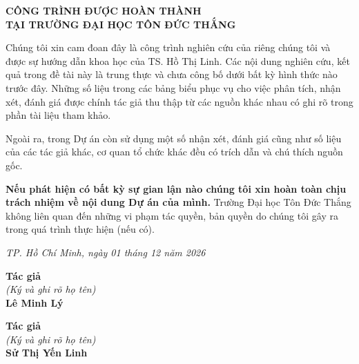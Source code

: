 \newpage
\begin{center}
{\fontsize{16pt}{24pt}\selectfont \textbf{CÔNG TRÌNH ĐƯỢC HOÀN THÀNH\\TẠI TRƯỜNG ĐẠI HỌC TÔN ĐỨC THẮNG}\par}
\end{center}
\vspace{0.5cm}

Chúng tôi xin cam đoan đây là công trình nghiên cứu của riêng chúng tôi và được sự hướng dẫn khoa học của TS. Hồ Thị Linh. Các nội dung nghiên cứu, kết quả trong đề tài này là trung thực và chưa công bố dưới bất kỳ hình thức nào trước đây. Những số liệu trong các bảng biểu phục vụ cho việc phân tích, nhận xét, đánh giá được chính tác giả thu thập từ các nguồn khác nhau có ghi rõ trong phần tài liệu tham khảo.

Ngoài ra, trong Dự án còn sử dụng một số nhận xét, đánh giá cũng như số liệu của các tác giả khác, cơ quan tổ chức khác đều có trích dẫn và chú thích nguồn gốc.

\textbf{Nếu phát hiện có bất kỳ sự gian lận nào chúng tôi xin hoàn toàn chịu trách nhiệm về nội dung Dự án của mình.} Trường Đại học Tôn Đức Thắng không liên quan đến những vi phạm tác quyền, bản quyền do chúng tôi gây ra trong quá trình thực hiện (nếu có).

\vspace{0.5cm}

\begin{flushright}
\textit{TP. Hồ Chí Minh, ngày 01 tháng 12 năm 2026}
\end{flushright}

\vspace{0.3cm}
\noindent
\begin{minipage}[t]{0.48\textwidth}
    \centering
    \textbf{Tác giả} \\
    \textit{(Ký và ghi rõ họ tên)} \\
    \vspace{2.5cm}
    \textbf{Lê Minh Lý}
\end{minipage}
\hfill
\begin{minipage}[t]{0.48\textwidth}
    \centering
    \textbf{Tác giả} \\
    \textit{(Ký và ghi rõ họ tên)} \\
    \vspace{2.5cm}
    \textbf{Sử Thị Yến Linh}
\end{minipage}
